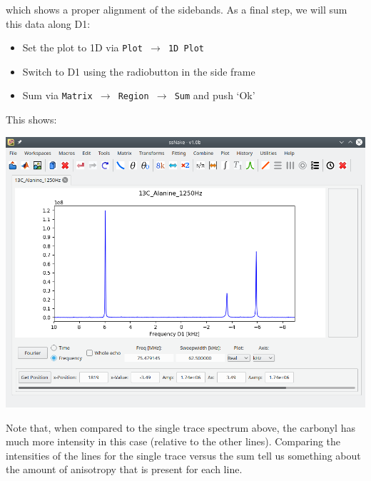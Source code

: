 \documentclass[11pt,a4paper]{article}
\begin{document}
which shows a proper alignment of the sidebands. As a final step, we will sum this data along D1:
\begin{itemize}
  \item Set the plot to 1D via \texttt{Plot $\longrightarrow$ 1D Plot}
  \item Switch to D1 using the radiobutton in the side frame
  \item Sum via \texttt{Matrix $\longrightarrow$ Region $\longrightarrow$ Sum} and push `Ok'
\end{itemize}
This shows:
\begin{center}
\includegraphics[width=0.8\linewidth]{Figs/Fig7.png}
\end{center}
Note that, when compared to the single trace spectrum above, the carbonyl has much more intensity in
this case (relative to the other lines). Comparing the intensities of the lines for the single trace
versus the sum tell us something about the amount of anisotropy that is present for each line.
\end{document}
